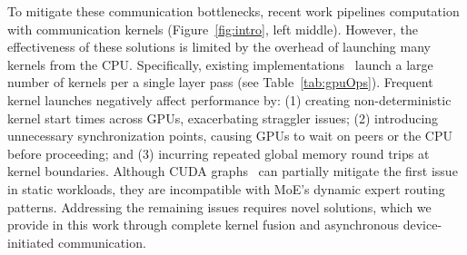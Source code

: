 
To mitigate these communication bottlenecks, recent work pipelines computation with communication kernels (Figure~\ref{fig:intro}, left middle). However, the effectiveness of these solutions is limited by the overhead of launching many kernels from the CPU. 
Specifically, existing implementations~\cite{pmlr-v162-rajbhandari22a, comet, megatron, fastermoe} launch a large number of kernels per a single layer pass (see Table~\ref{tab:gpuOps}). Frequent kernel launches negatively affect performance by:
(1) creating non-deterministic kernel start times across GPUs, exacerbating straggler issues; (2) introducing unnecessary synchronization points, causing GPUs to wait on peers or the CPU before proceeding; and (3) incurring repeated global memory round trips at kernel boundaries. Although CUDA graphs~\cite{cuda_graphs_nvidia_blog} can partially mitigate the first issue in static workloads, they are incompatible with MoE's dynamic expert routing patterns. Addressing the remaining issues requires novel solutions,
which we provide in this work through complete kernel fusion and asynchronous device-initiated communication.


